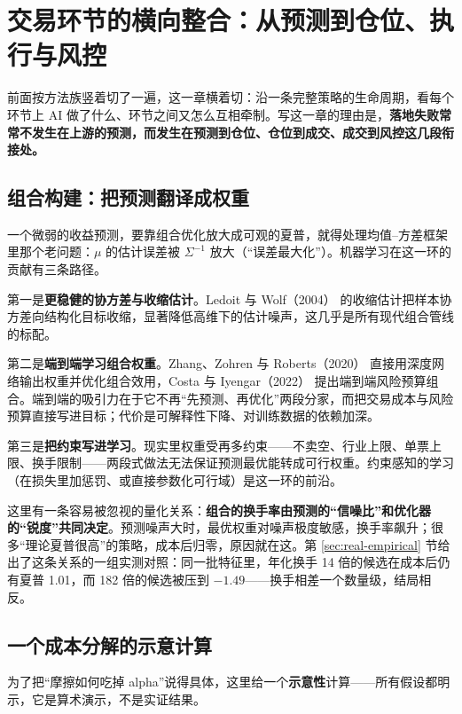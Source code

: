 \section{交易环节的横向整合：从预测到仓位、执行与风控}\label{sec:integration}

前面按方法族竖着切了一遍，这一章横着切：沿一条完整策略的生命周期，看每个环节上 AI 做了什么、环节之间又怎么互相牵制。写这一章的理由是，\textbf{落地失败常常不发生在上游的预测，而发生在预测到仓位、仓位到成交、成交到风控这几段衔接处。}

\subsection{组合构建：把预测翻译成权重}

一个微弱的收益预测，要靠组合优化放大成可观的夏普，就得处理均值--方差框架里那个老问题：$\mu$ 的估计误差被 $\Sigma^{-1}$ 放大（“误差最大化”）。机器学习在这一环的贡献有三条路径。

第一是\textbf{更稳健的协方差与收缩估计}。Ledoit 与 Wolf（2004）\cite{ledoitwolf2004} 的收缩估计把样本协方差向结构化目标收缩，显著降低高维下的估计噪声，这几乎是所有现代组合管线的标配。

第二是\textbf{端到端学习组合权重}。Zhang、Zohren 与 Roberts（2020）\cite{zhang2020dlpo} 直接用深度网络输出权重并优化组合效用，Costa 与 Iyengar（2022）\cite{costa2022} 提出端到端风险预算组合。端到端的吸引力在于它不再“先预测、再优化”两段分家，而把交易成本与风险预算直接写进目标；代价是可解释性下降、对训练数据的依赖加深。

第三是\textbf{把约束写进学习}。现实里权重受再多约束——不卖空、行业上限、单票上限、换手限制——两段式做法无法保证预测最优能转成可行权重。约束感知的学习（在损失里加惩罚、或直接参数化可行域）是这一环的前沿。

这里有一条容易被忽视的量化关系：\textbf{组合的换手率由预测的“信噪比”和优化器的“锐度”共同决定}。预测噪声大时，最优权重对噪声极度敏感，换手率飙升；很多“理论夏普很高”的策略，成本后归零，原因就在这。第 \ref{sec:real-empirical} 节给出了这条关系的一组实测对照：同一批特征里，年化换手 14 倍的候选在成本后仍有夏普 1.01，而 182 倍的候选被压到 $-1.49$——换手相差一个数量级，结局相反。

\subsection{一个成本分解的示意计算}

为了把“摩擦如何吃掉 alpha”说得具体，这里给一个\textbf{示意性}计算——所有假设都明示，它是算术演示，不是实证结果。

